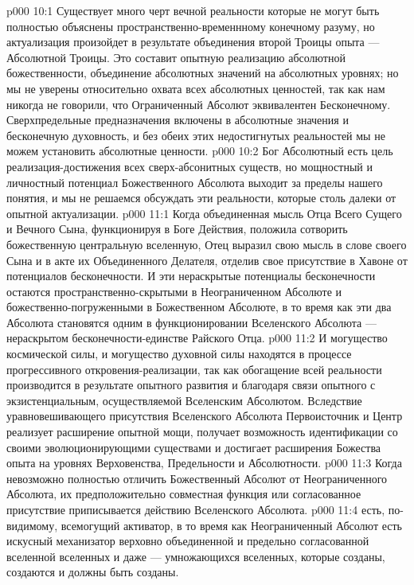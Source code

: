 \vs p000 10:1 Существует много черт вечной реальности  которые не могут быть полностью объяснены пространственно\hyp{}временнному конечному разуму, но актуализация  произойдет в результате объединения второй Троицы опыта --- Абсолютной Троицы. Это составит опытную реализацию абсолютной божественности, объединение абсолютных значений на абсолютных уровнях; но мы не уверены относительно охвата всех абсолютных ценностей, так как нам никогда не говорили, что Ограниченный Абсолют эквивалентен Бесконечному. Сверхпредельные предназначения включены в абсолютные значения и бесконечную духовность, и без обеих этих недостигнутых реальностей мы не можем установить абсолютные ценности.
\vs p000 10:2 Бог Абсолютный есть цель реализация\hyp{}достижения всех сверх\hyp{}абсонитных существ, но мощностный и личностный потенциал Божественного Абсолюта выходит за пределы нашего понятия, и мы не решаемся обсуждать эти реальности, которые столь далеки от опытной актуализации.
\vs p000 11:1 Когда объединенная мысль Отца Всего Сущего и Вечного Сына, функционируя в Боге Действия, положила сотворить божественную центральную вселенную, Отец выразил свою мысль в слове своего Сына и в акте их Объединенного Делателя, отделив свое присутствие в Хавоне от потенциалов бесконечности. И эти нераскрытые потенциалы бесконечности остаются пространственно\hyp{}скрытыми в Неограниченном Абсолюте и божественно\hyp{}погруженными в Божественном Абсолюте, в то время как эти два Абсолюта становятся одним в функционировании Вселенского Абсолюта --- нераскрытом бесконечности\hyp{}единстве Райского Отца.
\vs p000 11:2 И могущество космической силы, и могущество духовной силы находятся в процессе прогрессивного откровения\hyp{}реализации, так как обогащение всей реальности производится в результате опытного развития и благодаря связи опытного с экзистенциальным, осуществляемой Вселенским Абсолютом. Вследствие уравновешивающего присутствия Вселенского Абсолюта Первоисточник и Центр реализует расширение опытной мощи, получает возможность идентификации со своими эволюционирующими существами и достигает расширения Божества опыта на уровнях Верховенства, Предельности и Абсолютности.
\vs p000 11:3 \pc Когда невозможно полностью отличить Божественный Абсолют от Неограниченного Абсолюта, их предположительно совместная функция или согласованное присутствие приписывается действию Вселенского Абсолюта.
\vs p000 11:4 \pc {}\bibnobreakspace {} есть, по\hyp{}видимому, всемогущий активатор, в то время как Неограниченный Абсолют есть искусный механизатор верховно объединенной и предельно согласованной вселенной вселенных и даже --- умножающихся вселенных, которые созданы, создаются и должны быть созданы.
